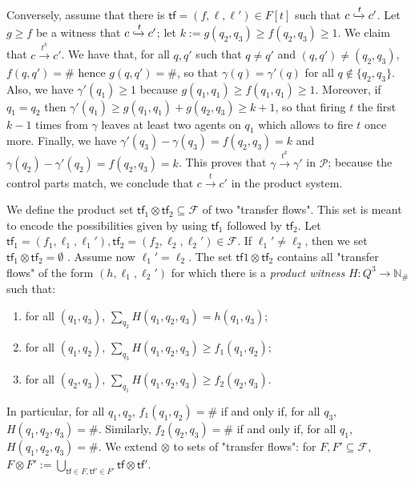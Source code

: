 \documentclass[10pt,a4paper]{article}
\let\mathbb\mathds
\renewcommand{\geq}{\geqslant}
\newcommand{\nats}{\mathbb{N}}
\newcommand{\set}[1]{\{#1\}}
\newcommand{\deff}{:=}
\newcommand{\prot}{\mathcal{P}}
\newcommand{\config}{\gamma}
\newcommand{\step}[1]{\xrightarrow{#1}}
\newcommand*{\states}{Q}
\newcommand*{\atrans}{t}
\newcommand*{\abuchistate}{\ell}
\newcommand*{\bstate}{\abuchistate}
\newcommand{\prodconfig}{c}
\newcommand*{\dummysymb}{\#}
\newcommand*{\natsanddummy}{\nats_{\dummysymb}}
\newcommand*{\transferflows}{\mathcal{F}}
\newcommand*{\transfersof}[1]{F[#1]}
\newcommand*{\atf}{\mathsf{tf}}
\newcommand*{\tfset}{F}
\newcommand*{\tftimes}{\otimes}
\newcommand*{\flowstep}[1]{\xhookrightarrow{#1}}
\begin{document}
\begin{appendixproof}
	Conversely, assume that there is \(\atf = (f,\bstate, \bstate') \in \transfersof{\atrans}\) such that \(\prodconfig \flowstep{\atrans} \prodconfig'\).
	Let \(g \geq f\) be a witness that \(\prodconfig \flowstep{\atrans} \prodconfig'\); let \(k \deff g(q_2,q_3) \geq f(q_2,q_3) \geq 1\).
	We claim that \(\prodconfig \step{\atrans^k} \prodconfig'\).
	We have that, for all \(q,q'\) such that \(q\ne q'\) and \((q,q') \ne (q_2,q_3)\), \(f(q,q') = \dummysymb\) hence \(g(q,q') = \dummysymb\), so that \(\config(q) = \config'(q)\) for all \(q \notin \set{q_2,q_3}\).
	Also, we have \(\config'(q_1) \geq 1\) because \(g(q_1,q_1) \geq f(q_1,q_1) \geq 1\).
	Moreover, if \(q_1 =q_2\) then \(\config'(q_1) \geq g(q_1,q_1) + g(q_2,q_3) \geq k+1\), so that firing \(t\) the first \(k-1\) times from \(\config\) leaves at least two agents on \(q_1\) which allows to fire \(\atrans\) once more.
	Finally, we have \(\config'(q_3) - \config(q_3) = f(q_2,q_3) = k\) and \(\config(q_2) - \config'(q_2) = f(q_2,q_3) = k\).
	This proves that \(\config \step{\atrans^k} \config'\) in \(\prot\); because the control parts match, we conclude that \(\prodconfig \step{\atrans} \prodconfig'\) in the product system.
\end{appendixproof}

We define the product set \(\atf_1 \tftimes \atf_2 \subseteq \transferflows\) of two "transfer flows".
This set is meant to encode the possibilities given by using \(\atf_1\) followed by \(\atf_2\).
Let \(\atf_1 = (f_1,\bstate_1,\bstate_1'), \atf_2 = (f_2,\bstate_2,\bstate_2') \in \transferflows\).
If \(\bstate_1' \ne \bstate_2\), then we set \(\atf_1 \tftimes \atf_2 = \emptyset\) .
Assume now \(\bstate_1' = \bstate_2\).
The set \(\atf1 \tftimes \atf_2\) contains all "transfer flows" of the form \((h,\bstate_1,\bstate_2')\) for which there is a \emph{product witness}
\(H : \states^3 \to \natsanddummy\) such that:
\begin{enumerate}[label = (prod.\roman*), leftmargin = 2cm,topsep=3pt]
	\item \label{composition-condition1} for all \((q_1,q_3)\), \(\sum_{q_2}
	      H(q_1,q_2,q_3) = h(q_1,q_3)\); \item \label{composition-condition2} for all \((q_1, q_2)\), \(\sum_{q_3} H(q_1,q_2,q_3) \geq f_1(q_1,q_2)\); \item \label{composition-condition3} for all \((q_2,q_3)\), \(\sum_{q_1} H(q_1,q_2,q_3) \geq f_2(q_2,q_3)\).
\end{enumerate}
In particular, for all \(q_1,q_2\), \(f_1(q_1,q_2) = \dummysymb\) if and only if, for all \(q_3\), \(H(q_1,q_2,q_3) = \dummysymb\).
Similarly, \(f_2(q_2,q_3) = \dummysymb\) if and only if, for all \(q_1\), \(H(q_1,q_2,q_3) = \dummysymb\).
We extend \(\tftimes\) to sets of "transfer flows": for \(F, F' \subseteq \transferflows\), \(\tfset \tftimes \tfset' \deff \bigcup_{\atf \in \tfset, \atf' \in \tfset'} \atf \tftimes \atf'\).
\end{document}
